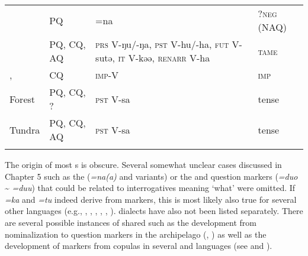 \begin{table}
\begin{tabularx}{\textwidth}{llQl}
 & PQ & =na & ?\textsc{neg} (NAQ)\\
 & PQ, CQ, AQ & \textsc{prs} V{}-ŋu/-ŋa, \textsc{pst} V{}-hu/-ha, \textsc{fut} V{}-sutə, \textsc{it} V{}-kəə, \textsc{renarr} V{}-ha & \textsc{tame}\\
,  & CQ & \textsc{imp-V} & \textsc{imp}\\
Forest  & PQ, CQ, ? & \textsc{pst} V-sa & tense\\
Tundra  & PQ, CQ, AQ & \textsc{pst} V-sa & tense\\
\lspbottomrule
\end{tabularx}
\end{table}

The origin of most s is obscure. Several somewhat unclear cases discussed in Chapter 5 such as the  (\textit{=na(a)} and variants) or the  and  question markers (\textit{=duo} {\textasciitilde} \textit{=duu}) that could be related to interrogatives meaning ‘what’ were omitted. If  \textit{=ka} and \textit{=tu} indeed derive from  markers, this is most likely also true for several other  languages (e.g., , , , , , ).  dialects have also not been listed separately. There are several possible instances of shared  such as the development from nominalization to question markers in the  archipelago (, ) as well as the development of  markers from copulas in several  and  languages (see  and ).

